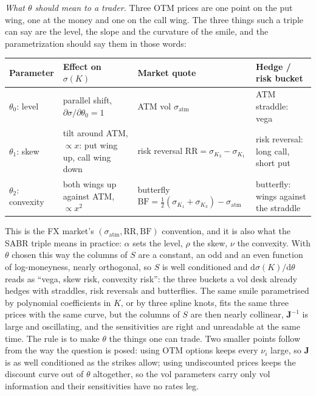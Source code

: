 \documentclass[11pt]{article}
\newcommand{\J}{\mathbf{J}}
\newcommand{\dd}{\mathrm{d}}
\begin{document}
\emph{What $\theta$ should mean to a trader.} Three OTM prices are one point on the put wing, one at the money and one on the call wing. The three things such a triple can say are the level, the slope and the curvature of the smile, and the parametrization should say them in those words:
\begin{center}
\begin{tabular}{@{}>{\raggedright\arraybackslash}p{2.3cm}>{\raggedright\arraybackslash}p{4.3cm}>{\raggedright\arraybackslash}p{4.0cm}>{\raggedright\arraybackslash}p{4.0cm}@{}}
\toprule
Parameter & Effect on $\sigma(K)$ & Market quote & Hedge / risk bucket \\
\midrule
$\theta_0$: level & parallel shift, $\partial\sigma/\partial\theta_0=1$ & ATM vol $\sigma_{\mathrm{atm}}$ & ATM straddle: vega \\
$\theta_1$: skew & tilt around ATM, $\propto x$: put wing up, call wing down & risk reversal $\mathrm{RR}=\sigma_{K_3}-\sigma_{K_1}$ & risk reversal: long call, short put \\
$\theta_2$: convexity & both wings up against ATM, $\propto x^2$ & butterfly $\mathrm{BF}=\tfrac12(\sigma_{K_1}+\sigma_{K_3})-\sigma_{\mathrm{atm}}$ & butterfly: wings against the straddle \\
\bottomrule
\end{tabular}
\end{center}
This is the FX market's $(\sigma_{\mathrm{atm}},\mathrm{RR},\mathrm{BF})$ convention, and it is also what the SABR triple means in practice: $\alpha$ sets the level, $\rho$ the skew, $\nu$ the convexity. With $\theta$ chosen this way the columns of $S$ are a constant, an odd and an even function of log-moneyness, nearly orthogonal, so $S$ is well conditioned and $\dd\sigma(K)/\dd\theta$ reads as ``vega, skew risk, convexity risk'': the three buckets a vol desk already hedges with straddles, risk reversals and butterflies. The same smile parametrised by polynomial coefficients in $K$, or by three spline knots, fits the same three prices with the same curve, but the columns of $S$ are then nearly collinear, $\J^{-1}$ is large and oscillating, and the sensitivities are right and unreadable at the same time. The rule is to make $\theta$ the things one can trade. Two smaller points follow from the way the question is posed: using OTM options keeps every $\nu_i$ large, so $\J$ is as well conditioned as the strikes allow; using undiscounted prices keeps the discount curve out of $\theta$ altogether, so the vol parameters carry only vol information and their sensitivities have no rates leg.
\end{document}
